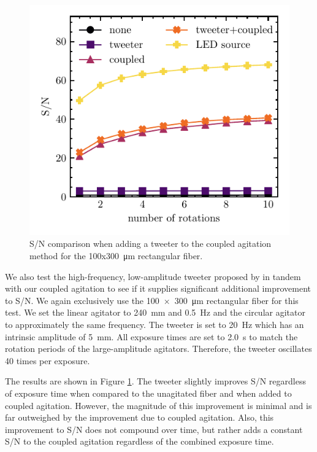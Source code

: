 \documentclass[twocolumn]{emulateapj}
\begin{document}
\begin{figure}
\centering
	\includegraphics[width=\columnwidth]{images/tweeter_snr.pdf}
	\caption{S/N comparison when adding a tweeter to the coupled agitation method for the 100x\SI{300}{\micro\meter} rectangular fiber.}
\label{fig:tweeter_snr}
\end{figure}

We also test the high-frequency, low-amplitude tweeter proposed by \citet{Plavchan2013} in tandem with our coupled agitation to see if it supplies significant additional improvement to S/N. We again exclusively use the \SI{100x300}{\micro\meter} rectangular fiber for this test. We set the linear agitator to \SI{240}{\milli\meter} and \SI{0.5}{\hertz} and the circular agitator to approximately the same frequency. The tweeter is set to \SI{20}{\hertz} which has an intrinsic amplitude of \SI{5}{\milli\meter}. All exposure times are set to \SI{2.0}{\second} to match the rotation periods of the large-amplitude agitators. Therefore, the tweeter oscillates 40 times per exposure.

The results are shown in Figure \ref{fig:tweeter_snr}. The tweeter slightly improves S/N regardless of exposure time when compared to the unagitated fiber and when added to coupled agitation. However, the magnitude of this improvement is minimal and is far outweighed by the improvement due to coupled agitation. Also, this improvement to S/N does not compound over time, but rather adds a constant S/N to the coupled agitation regardless of the combined exposure time.
\end{document}
